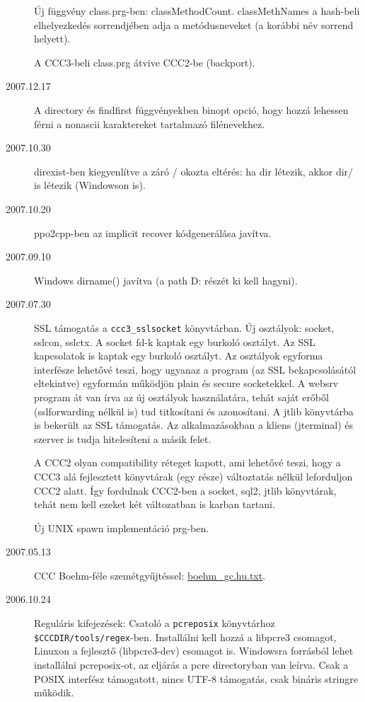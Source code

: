 \begin{description}
  Új függvény class.prg-ben: classMethodCount.
  classMethNames a hash-beli elhelyezkedés sorrendjében adja
  a metódusneveket (a korábbi név sorrend helyett).
  
  A CCC3-beli class.prg átvive CCC2-be (backport).

\item[2007.12.17]
  A directory és findfirst függvényekben binopt opció,
  hogy hozzá lehessen férni a nonascii karaktereket tartalmazó
  filénevekhez.

\item[2007.10.30]
  direxist-ben kiegyenlítve a záró / okozta eltérés:
  ha dir létezik, akkor dir/ is létezik (Windowson is).

\item[2007.10.20]
  ppo2cpp-ben az implicit recover kódgenerálása javítva.

\item[2007.09.10]
  Windows dirname() javítva (a path D: részét ki kell hagyni).

\label{20070730}
\item[2007.07.30]
  SSL támogatás a \verb!ccc3_sslsocket! könyvtárban.
  Új osztályok: socket, sslcon, sslctx.
  A socket fd-k kaptak egy burkoló osztályt. 
  Az SSL kapcsolatok is kaptak egy burkoló osztályt.
  Az osztályok  egyforma interfésze lehetővé teszi, 
  hogy ugyanaz a program (az SSL bekapcsolásától eltekintve) 
  egyformán működjön plain és secure socketekkel.
  A websrv program át van írva az új osztályok használatára,
  tehát saját erőből (sslforwarding nélkül is) tud titkosítani és azonosítani.
  A jtlib könyvtárba is bekerült az SSL támogatás. 
  Az alkalmazásokban a kliens (jterminal) és szerver is 
  tudja hitelesíteni a másik felet.
  
  A CCC2 olyan compatibility réteget kapott, ami lehetővé teszi,
  hogy a CCC3 alá fejlesztett könyvtárak (egy része) változtatás
  nélkül leforduljon CCC2 alatt. Így fordulnak CCC2-ben 
  a socket, sql2, jtlib  könyvtárak, 
  tehát nem kell ezeket két változatban is karban tartani.

  Új UNIX spawn implementáció prg-ben.

\label{20070513}
\item[2007.05.13]
  CCC Boehm-féle szemétgyűjtéssel:  \href{boehm_gc.hu.txt}{boehm\_gc.hu.txt}.

\label{20061024}
\item[2006.10.24]
  Reguláris kifejezések: Csatoló a \verb!pcreposix! 
  könyvtárhoz \verb!$CCCDIR/tools/regex!-ben.
  Installálni kell hozzá a libpcre3 csomagot,
  Linuxon a fejlesztő (libpcre3-dev) csomagot is.
  Windowsra forrásból lehet installálni pcreposix-ot,
  az eljárás a pcre directoryban van leírva.
  Csak a POSIX interfész támogatott,
  nincs UTF-8 támogatás, 
  csak bináris stringre működik.


\end{description}
